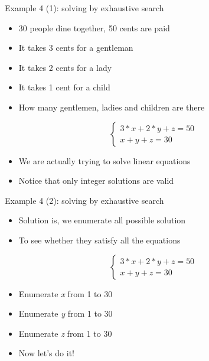 \begin{frame}[fragile]{Example 4 (1): solving by exhaustive search}
\begin{itemize}
   \item {30 people dine together, 50 cents are paid}
   \item {It takes 3 cents for a gentleman}
   \item {It takes 2 cents for a lady}
   \item {It takes 1 cent for a child}
   \item {How many gentlemen, ladies and children are there}
\end{itemize}
\begin{equation}
\left \{ \begin{array}{l}
  3*x+2*y+z=50 \\
  x+y+z=30
\end{array} \right.  \nonumber
\end{equation}
\begin{itemize}
	\item {We are actually trying to solve linear equations}
	\item {Notice that only integer solutions are valid}
\end{itemize}
\end{frame}

\begin{frame}[fragile]{Example 4 (2): solving by exhaustive search}
\begin{itemize}
   \item {Solution is, we enumerate all possible solution}
   \item {To see whether they satisfy all the equations}
\end{itemize}
\begin{equation}
\left \{ \begin{array}{l}
  3*x+2*y+z=50 \\
  x+y+z=30
\end{array} \right.  \nonumber
\end{equation}
\begin{itemize}
	\item {Enumerate \textit{x} from 1 to 30}
	\item {Enumerate \textit{y} from 1 to 30}
	\item {Enumerate \textit{z} from 1 to 30}
	\item {Now let's do it!}
\end{itemize}
\end{frame}

